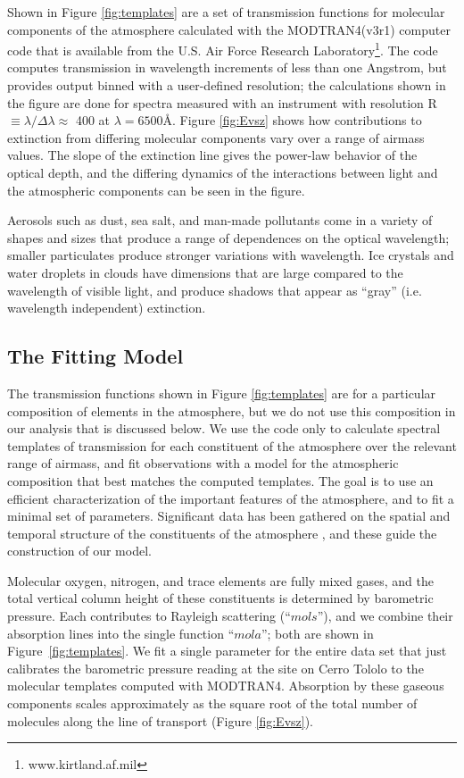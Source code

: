 \documentclass[manuscript]{aastex}
\begin{document}
Shown in Figure \ref{fig:templates} are a set of transmission functions for molecular components of the atmosphere
calculated with the MODTRAN4(v3r1) computer code \cite{MODTRAN}
that is available from the U.S. Air Force Research Laboratory\footnote{www.kirtland.af.mil}.
The code computes transmission in wavelength increments of less than one Angstrom, but provides output binned with a user-defined resolution; 
the calculations shown in the figure are done for spectra measured with an instrument with resolution R $\equiv \lambda/\Delta\lambda \approx $ 400
at $\lambda = 6500$\AA.
Figure \ref{fig:Evsz} shows how contributions to extinction from differing molecular components vary over a range of airmass values. 
The slope of the extinction line gives the power-law behavior of the optical depth,
and the differing dynamics of the interactions between light and the atmospheric components can be seen in the figure.  

Aerosols such as dust, sea salt, and man-made pollutants come in a variety of shapes and sizes that produce a range of dependences on the optical wavelength;
smaller particulates produce stronger variations with wavelength. 
Ice crystals and water droplets in clouds have dimensions that are large compared to the wavelength of visible light, and produce shadows that 
appear as ``gray'' (i.e. wavelength independent) extinction.

\subsection{The Fitting Model}

The transmission functions shown in Figure \ref{fig:templates} are for a particular composition of elements in the atmosphere,
but we do not use this composition in our analysis that is discussed below.
We use the code only to calculate spectral templates of transmission for each constituent of the atmosphere over the relevant range of airmass,
and fit observations with a model for the atmospheric composition that best matches the computed templates.
The goal is to use an efficient characterization of the important features of the atmosphere, and to fit a minimal set of parameters.
Significant data has been gathered on the spatial and temporal structure of the constituents of the atmosphere \cite{stubbs07},
and these guide the construction of our model.

Molecular oxygen, nitrogen, and trace elements are fully mixed gases,
and the total vertical column height of these constituents is determined by barometric pressure. 
Each contributes to Rayleigh scattering (``$mols$''), and we combine their absorption lines into the single function
``$mola$''; both are shown in Figure~\ref{fig:templates}.
We fit a single parameter for the entire data set that just calibrates the barometric pressure reading at the site on Cerro Tololo
to the molecular templates computed with MODTRAN4.
Absorption by these gaseous components scales approximately as the square root of the total number of molecules along the
line of transport (Figure \ref{fig:Evsz}).
\end{document}
